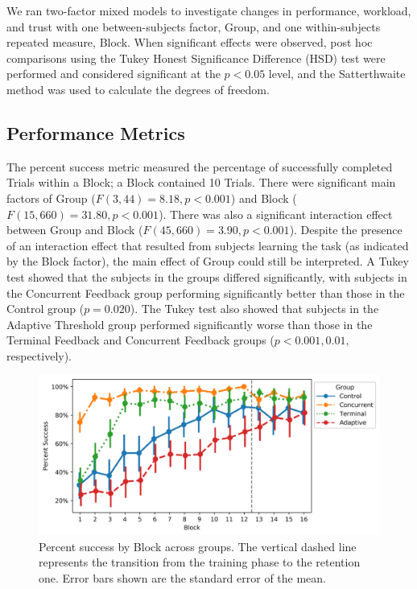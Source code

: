 We ran two-factor mixed models to investigate changes in performance, workload, and trust with one between-subjects factor, Group, and one within-subjects repeated measure, Block.
When significant effects were observed, post hoc comparisons using the Tukey Honest Significance Difference (HSD) test were performed and considered significant at the $p < 0.05$ level, and the Satterthwaite method was used to calculate the degrees of freedom.

\subsection{Performance Metrics}
The percent success metric measured the percentage of successfully completed Trials within a Block; a Block contained 10 Trials.
There were significant main factors of Group ($F(3, 44) = 8.18, p < 0.001$) and Block ($F(15, 660) = 31.80, p < 0.001$).
There was also a significant interaction effect between Group and Block ($F(45, 660) = 3.90, p < 0.001$).
Despite the presence of an interaction effect that resulted from subjects learning the task (as indicated by the Block factor), the main effect of Group could still be interpreted.
A Tukey test showed that the subjects in the groups differed significantly, with subjects in the Concurrent Feedback group performing significantly better than those in the Control group ($p = 0.020$).
The Tukey test also showed that subjects in the Adaptive Threshold group performed significantly worse than those in the Terminal Feedback and Concurrent Feedback groups ($p < 0.001, 0.01,$ respectively).

\begin{figure}[hbt!]
	\centering
	\includegraphics[height=.4\textwidth]{figures/EMG/PercentSuccess}
	\caption[Percent success by Block across groups]{Percent success by Block across groups.
		The vertical dashed line represents the transition from the training phase to the retention one.
		Error bars shown are the standard error of the mean.}
	\label{figure:label3}
\end{figure}

